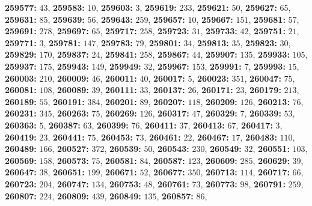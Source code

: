 \textsf{\bfseries 259577:} $43$, \textsf{\bfseries 259583:} $10$, \textsf{\bfseries 259603:} $3$, \textsf{\bfseries 259619:} $233$, \textsf{\bfseries 259621:} $50$, \textsf{\bfseries 259627:} $65$, \textsf{\bfseries 259631:} $85$, \textsf{\bfseries 259639:} $56$, \textsf{\bfseries 259643:} $259$, \textsf{\bfseries 259657:} $10$, \textsf{\bfseries 259667:} $151$, \textsf{\bfseries 259681:} $57$, \textsf{\bfseries 259691:} $278$, \textsf{\bfseries 259697:} $65$, \textsf{\bfseries 259717:} $258$, \textsf{\bfseries 259723:} $31$, \textsf{\bfseries 259733:} $42$, \textsf{\bfseries 259751:} $21$, \textsf{\bfseries 259771:} $3$, \textsf{\bfseries 259781:} $147$, \textsf{\bfseries 259783:} $79$, \textsf{\bfseries 259801:} $34$, \textsf{\bfseries 259813:} $35$, \textsf{\bfseries 259823:} $30$, \textsf{\bfseries 259829:} $170$, \textsf{\bfseries 259837:} $24$, \textsf{\bfseries 259841:} $258$, \textsf{\bfseries 259867:} $44$, \textsf{\bfseries 259907:} $135$, \textsf{\bfseries 259933:} $105$, \textsf{\bfseries 259937:} $175$, \textsf{\bfseries 259943:} $149$, \textsf{\bfseries 259949:} $32$, \textsf{\bfseries 259967:} $153$, \textsf{\bfseries 259991:} $7$, \textsf{\bfseries 259993:} $15$, \textsf{\bfseries 260003:} $210$, \textsf{\bfseries 260009:} $46$, \textsf{\bfseries 260011:} $40$, \textsf{\bfseries 260017:} $5$, \textsf{\bfseries 260023:} $351$, \textsf{\bfseries 260047:} $75$, \textsf{\bfseries 260081:} $108$, \textsf{\bfseries 260089:} $39$, \textsf{\bfseries 260111:} $33$, \textsf{\bfseries 260137:} $26$, \textsf{\bfseries 260171:} $23$, \textsf{\bfseries 260179:} $213$, \textsf{\bfseries 260189:} $55$, \textsf{\bfseries 260191:} $384$, \textsf{\bfseries 260201:} $89$, \textsf{\bfseries 260207:} $118$, \textsf{\bfseries 260209:} $126$, \textsf{\bfseries 260213:} $76$, \textsf{\bfseries 260231:} $345$, \textsf{\bfseries 260263:} $75$, \textsf{\bfseries 260269:} $126$, \textsf{\bfseries 260317:} $47$, \textsf{\bfseries 260329:} $7$, \textsf{\bfseries 260339:} $53$, \textsf{\bfseries 260363:} $5$, \textsf{\bfseries 260387:} $63$, \textsf{\bfseries 260399:} $76$, \textsf{\bfseries 260411:} $37$, \textsf{\bfseries 260413:} $67$, \textsf{\bfseries 260417:} $3$, \textsf{\bfseries 260419:} $23$, \textsf{\bfseries 260441:} $75$, \textsf{\bfseries 260453:} $73$, \textsf{\bfseries 260461:} $22$, \textsf{\bfseries 260467:} $17$, \textsf{\bfseries 260483:} $110$, \textsf{\bfseries 260489:} $166$, \textsf{\bfseries 260527:} $372$, \textsf{\bfseries 260539:} $50$, \textsf{\bfseries 260543:} $230$, \textsf{\bfseries 260549:} $32$, \textsf{\bfseries 260551:} $103$, \textsf{\bfseries 260569:} $158$, \textsf{\bfseries 260573:} $75$, \textsf{\bfseries 260581:} $84$, \textsf{\bfseries 260587:} $123$, \textsf{\bfseries 260609:} $285$, \textsf{\bfseries 260629:} $39$, \textsf{\bfseries 260647:} $38$, \textsf{\bfseries 260651:} $199$, \textsf{\bfseries 260671:} $52$, \textsf{\bfseries 260677:} $350$, \textsf{\bfseries 260713:} $114$, \textsf{\bfseries 260717:} $66$, \textsf{\bfseries 260723:} $204$, \textsf{\bfseries 260747:} $134$, \textsf{\bfseries 260753:} $48$, \textsf{\bfseries 260761:} $73$, \textsf{\bfseries 260773:} $98$, \textsf{\bfseries 260791:} $259$, \textsf{\bfseries 260807:} $224$, \textsf{\bfseries 260809:} $439$, \textsf{\bfseries 260849:} $135$, \textsf{\bfseries 260857:} $86$, 
